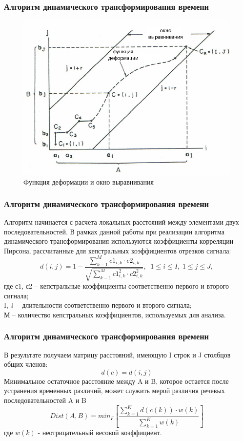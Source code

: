 \documentclass[slidestop, compress, mathserif, blackandwhite, utf8, serif, slidescentered]{beamer}
\begin{document}
\begin{frame}[plain]
	\frametitle{Алгоритм динамического трансформирования времени}
	\begin{figure}[h]	
	\centering
	\includegraphics[width=.6\textwidth]{../sakoe1.png}			
	\caption{Функция деформации и окно выравнивания}
	\label{sakoe1}
	\end{figure}
\end{frame}

\begin{frame}[plain]
	\frametitle{Алгоритм динамического трансформирования времени}
	Алгоритм начинается с расчета локальных расстояний между элементами двух последовательностей. 
	В рамках данной работы при реализации алгоритма динамического трансформирования используются коэффициенты корреляции Пирсона, рассчитанные для кепстральных коэффициентов отрезков сигнала:
	\begin{equation}
		d(i,j)=1-\frac{\sum_{k-1}^{M}c1_{i,k}\cdot c2_{i,k}}{\sqrt{\sum_{k-1}^{M}c1_{i,k}^2 \cdot c2_{i,k}^2}}, \; \; 1 \leq i \leq I, \; 1 \leq j \leq J,
		\label{eq:pirson}
	\end{equation}
	где с1, с2 – кепстральные коэффициенты соответственно первого и второго сигнала;\\
	I, J – длительности соответственно первого и второго сигнала;\\
	М – количество кепстральных коэффициентов, используемых для анализа.
\end{frame}

\begin{frame}[plain]
	\frametitle{Алгоритм динамического трансформирования времени}
	В результате получаем матрицу расстояний, имеющую I строк и J столбцов общих членов:
	\begin{equation}
		d(c)=d(i,j)
	\end{equation}
	 Минимальное остаточное расстояние между A и B, которое остается после устранения временных различий, может служить мерой различия речевых последовательностей A и B
	\begin{equation}
		Dist(A,B)=min_F\left[\frac{\sum_{k=1}^{K}{d(c(k))\cdot w(k)}}{\sum_{k=1}^{K}{w(k)}}\right]
		\label{eq:dist}
	\end{equation}
	где $w(k)$ - неотрицательный весовой коэффициент.
\end{frame}
\end{document}
